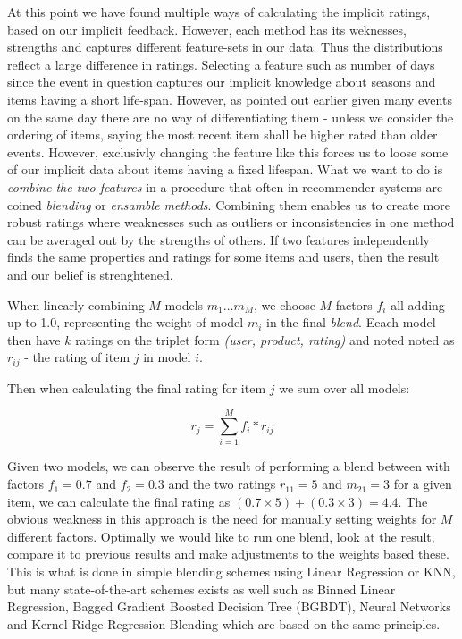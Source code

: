 At this point we have found multiple ways of calculating the implicit ratings,
based on our implicit feedback. However, each method has its weknesses,
strengths and captures different feature-sets in our data. Thus the
distributions reflect a large difference in ratings. Selecting a feature such
as number of days since the event in question captures our implicit knowledge
about seasons and items having a short life-span. However, as pointed out
earlier given many events on the same day there are no way of differentiating
them - unless we consider the ordering of items, saying the most recent item
shall be higher rated than older events. However, exclusivly changing the
feature like this forces us to loose some of our implicit data about items
having a fixed lifespan. What we want to do is \textit{combine the two
features} in a procedure that often in recommender systems are coined
\textit{blending} or \textit{ensamble methods}. Combining them enables us to
create more robust ratings where weaknesses such as outliers or inconsistencies
in one method can be averaged out by the strengths of others. If two features
independently finds the same properties and ratings for some items and users,
then the result and our belief is strenghtened.

When linearly combining $M$ models $m_1 \dots m_M$, we choose $M$ factors $f_i$
all adding up to 1.0, representing the weight of model $m_{i}$ in the final
\textit{blend}. Eeach model then have $k$ ratings on the triplet form
\textit{(user, product, rating)} and noted noted as $r_{ij}$ - the rating of
item $j$ in model $i$.

Then when calculating the final rating for item $j$ we sum over all
models:

\begin{equation}
  r_j = \sum _{i=1}^{M} f_{i} * r_{ij}
\end{equation}

Given two models, we can observe the result of performing a blend between with
factors $f_1 = 0.7$ and $f_2 = 0.3$ and the two ratings $r_{11} = 5$ and
$m_{21} = 3$ for a given item, we can calculate the final rating as $(0.7
\times 5) + (0.3 \times 3) = 4.4$. The obvious weakness in this approach is the
need for manually setting weights for $M$ different factors. Optimally we would
like to run one blend, look at the result, compare it to previous results and
make adjustments to the weights based these. This is what is done in simple
blending schemes using Linear Regression or KNN, but many state-of-the-art
schemes exists as well such as Binned Linear Regression, Bagged Gradient
Boosted Decision Tree (BGBDT), Neural Networks and Kernel Ridge Regression
Blending \cite{jahrer2010combining} \cite{toscher2009bigchaos} which are based
on the same principles.

